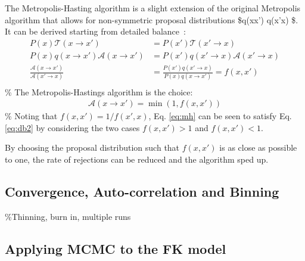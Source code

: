 The Metropolis-Hasting algorithm is a slight extension of the original Metropolis algorithm that allows for non-symmetric proposal distributions \$q(x\to x') \neq q(x'\to x) \$. It can be derived starting from detailed balance~\autocite{krauthIntroductionMonteCarlo1998}: \[\begin{aligned}
P(x)\mathcal{T}(x \to x') &= P(x')\mathcal{T}(x' \to x) \\
P(x)q(x \to x')\mathcal{A}(x \to x') &= P(x')q(x' \to x)\mathcal{A}(x' \to x) \\
\label{eq:db2} \frac{\mathcal{A}(x \to x')}{\mathcal{A}(x' \to x)} &= \frac{P(x')q(x' \to x)}{P(x)q(x \to x')} = f(x, x')\\
\end{aligned}
\] \% The Metropolis-Hastings algorithm is the choice: \[
\begin{aligned}
\label{eq:mh} 
\mathcal{A}(x \to x') = \min\left(1, f(x,x')\right)
\end{aligned}
\] \% Noting that \(f(x,x') = 1/f(x',x)\), Eq. \ref{eq:mh} can be seen to satisfy Eq. \ref{eq:db2} by considering the two cases \(f(x,x') > 1\) and \(f(x,x') < 1\).

By choosing the proposal distribution such that \(f(x,x')\) is as close as possible to one, the rate of rejections can be reduced and the algorithm sped up.

\hypertarget{convergence-auto-correlation-and-binning}{%
\subsection{Convergence, Auto-correlation and Binning}\label{convergence-auto-correlation-and-binning}}

\%Thinning, burn in, multiple runs

\hypertarget{applying-mcmc-to-the-fk-model}{%
\subsection{Applying MCMC to the FK model}\label{applying-mcmc-to-the-fk-model}}

